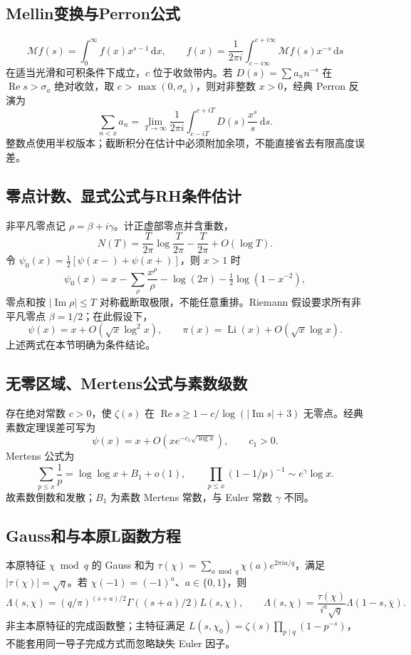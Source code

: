 \documentclass[../main.tex]{subfiles}
\begin{document}
\subsection{Mellin变换与Perron公式}
\[
\mathcal Mf(s)=\int_0^\infty f(x)x^{s-1}\,\mathrm dx,\qquad
f(x)=\frac1{2\pi i}\int_{c-i\infty}^{c+i\infty}\mathcal Mf(s)x^{-s}\,\mathrm ds
\]
在适当光滑和可积条件下成立，$c$ 位于收敛带内。若 $D(s)=\sum a_nn^{-s}$ 在 $\operatorname{Re}s>\sigma_a$ 绝对收敛，取 $c>\max(0,\sigma_a)$，则对非整数 $x>0$，经典 Perron 反演为
\[
\sum_{n<x}a_n=\lim_{T\to\infty}\frac1{2\pi i}\int_{c-iT}^{c+iT}D(s)\frac{x^s}s\,\mathrm ds.
\]
整数点使用半权版本；截断积分在估计中必须附加余项，不能直接省去有限高度误差。
\subsection{零点计数、显式公式与RH条件估计}
非平凡零点记 $\rho=\beta+i\gamma$。计正虚部零点并含重数，
\[
N(T)=\frac T{2\pi}\log\frac T{2\pi}-\frac T{2\pi}+O(\log T).
\]
令 $\psi_0(x)=\tfrac12[\psi(x-)+\psi(x+)]$，则 $x>1$ 时
\[
\psi_0(x)=x-\sum_\rho\frac{x^\rho}\rho-\log(2\pi)-\tfrac12\log(1-x^{-2}),
\]
零点和按 $|\operatorname{Im}\rho|\le T$ 对称截断取极限，不能任意重排。Riemann 假设要求所有非平凡零点 $\beta=1/2$；在此假设下，
\[
\psi(x)=x+O(\sqrt x\log^2x),\qquad
\pi(x)=\operatorname{Li}(x)+O(\sqrt x\log x).
\]
上述两式在本节明确为条件结论。
\subsection{无零区域、Mertens公式与素数级数}
存在绝对常数 $c>0$，使 $\zeta(s)$ 在 $\operatorname{Re}s\ge1-c/\log(|\operatorname{Im}s|+3)$ 无零点。经典素数定理误差可写为
\[
\psi(x)=x+O(xe^{-c_1\sqrt{\log x}}),\qquad c_1>0.
\]
Mertens 公式为
\[
\sum_{p\le x}\frac1p=\log\log x+B_1+o(1),\qquad
\prod_{p\le x}(1-1/p)^{-1}\sim e^\gamma\log x.
\]
故素数倒数和发散；$B_1$ 为素数 Mertens 常数，与 Euler 常数 $\gamma$ 不同。
\subsection{Gauss和与本原L函数方程}
本原特征 $\chi\bmod q$ 的 Gauss 和为 $\tau(\chi)=\sum_{a\bmod q}\chi(a)e^{2\pi ia/q}$，满足 $|\tau(\chi)|=\sqrt q$。若 $\chi(-1)=(-1)^a$、$a\in\{0,1\}$，则
\[
\Lambda(s,\chi)=(q/\pi)^{(s+a)/2}\Gamma((s+a)/2)L(s,\chi),\qquad
\Lambda(s,\chi)=\frac{\tau(\chi)}{i^a\sqrt q}\Lambda(1-s,\overline\chi).
\]
非主本原特征的完成函数整；主特征满足 $L(s,\chi_0)=\zeta(s)\prod_{p\mid q}(1-p^{-s})$，不能套用同一导子完成方式而忽略缺失 Euler 因子。
\end{document}
